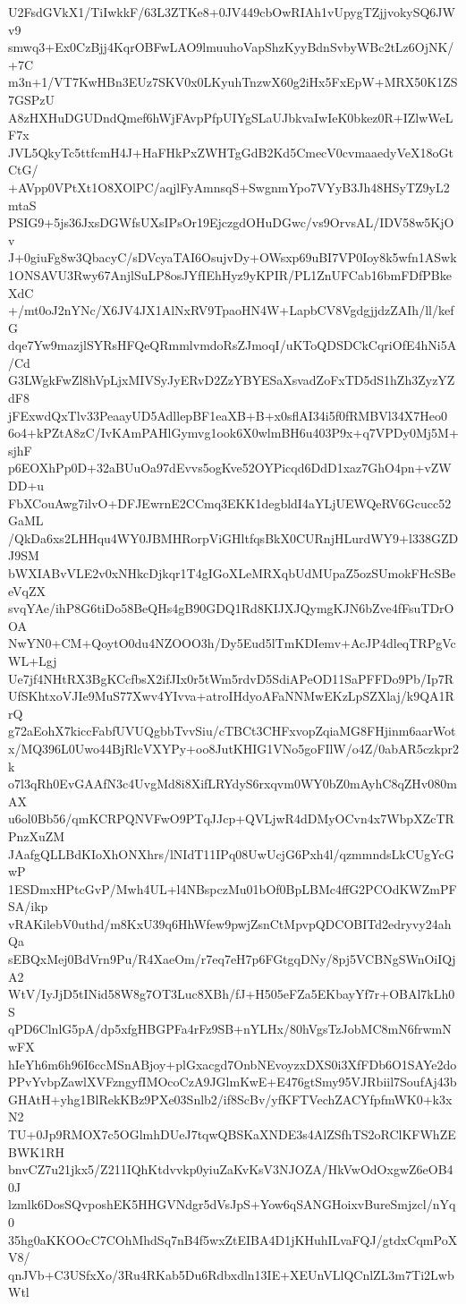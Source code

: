 U2FsdGVkX1/TiIwkkF/63L3ZTKe8+0JV449cbOwRIAh1vUpygTZjjvokySQ6JWv9
smwq3+Ex0CzBjj4KqrOBFwLAO9lmuuhoVapShzKyyBdnSvbyWBc2tLz6OjNK/+7C
m3n+1/VT7KwHBn3EUz7SKV0x0LKyuhTnzwX60g2iHx5FxEpW+MRX50K1ZS7GSPzU
A8zHXHuDGUDndQmef6hWjFAvpPfpUIYgSLaUJbkvaIwIeK0bkez0R+IZlwWeLF7x
JVL5QkyTc5ttfcmH4J+HaFHkPxZWHTgGdB2Kd5CmecV0cvmaaedyVeX18oGtCtG/
+AVpp0VPtXt1O8XOlPC/aqjlFyAmnsqS+SwgnmYpo7VYyB3Jh48HSyTZ9yL2mtaS
PSIG9+5js36JxsDGWfsUXsIPsOr19EjczgdOHuDGwc/vs9OrvsAL/IDV58w5KjOv
J+0giuFg8w3QbacyC/sDVcyaTAI6OsujvDy+OWsxp69uBI7VP0Ioy8k5wfn1ASwk
1ONSAVU3Rwy67AnjlSuLP8osJYfIEhHyz9yKPIR/PL1ZnUFCab16bmFDfPBkeXdC
+/mt0oJ2nYNc/X6JV4JX1AlNxRV9TpaoHN4W+LapbCV8VgdgjjdzZAIh/ll/kefG
dqe7Yw9mazjlSYRsHFQeQRmmlvmdoRsZJmoqI/uKToQDSDCkCqriOfE4hNi5A/Cd
G3LWgkFwZl8hVpLjxMIVSyJyERvD2ZzYBYESaXsvadZoFxTD5dS1hZh3ZyzYZdF8
jFExwdQxTlv33PeaayUD5AdllepBF1eaXB+B+x0sflAI34i5f0fRMBVl34X7Heo0
6o4+kPZtA8zC/IvKAmPAHlGymvg1ook6X0wlmBH6u403P9x+q7VPDy0Mj5M+sjhF
p6EOXhPp0D+32aBUuOa97dEvvs5ogKve52OYPicqd6DdD1xaz7GhO4pn+vZWDD+u
FbXCouAwg7ilvO+DFJEwrnE2CCmq3EKK1degbldI4aYLjUEWQeRV6Gcucc52GaML
/QkDa6xs2LHHqu4WY0JBMHRorpViGHltfqsBkX0CURnjHLurdWY9+l338GZDJ9SM
bWXIABvVLE2v0xNHkcDjkqr1T4gIGoXLeMRXqbUdMUpaZ5ozSUmokFHcSBeeVqZX
svqYAe/ihP8G6tiDo58BeQHs4gB90GDQ1Rd8KIJXJQymgKJN6bZve4fFsuTDrOOA
NwYN0+CM+QoytO0du4NZOOO3h/Dy5Eud5lTmKDIemv+AcJP4dleqTRPgVcWL+Lgj
Ue7jf4NHtRX3BgKCcfbsX2ifJIx0r5tWm5rdvD5SdiAPeOD11SaPFFDo9Pb/Ip7R
UfSKhtxoVJIe9MuS77Xwv4YIvva+atroIHdyoAFaNNMwEKzLpSZXlaj/k9QA1RrQ
g72aEohX7kiccFabfUVUQgbbTvvSiu/cTBCt3CHFxvopZqiaMG8FHjinm6aarWot
x/MQ396L0Uwo44BjRlcVXYPy+oo8JutKHIG1VNo5goFIlW/o4Z/0abAR5czkpr2k
o7l3qRh0EvGAAfN3c4UvgMd8i8XifLRYdyS6rxqvm0WY0bZ0mAyhC8qZHv080mAX
u6ol0Bb56/qmKCRPQNVFwO9PTqJJcp+QVLjwR4dDMyOCvn4x7WbpXZcTRPnzXuZM
JAafgQLLBdKIoXhONXhrs/lNIdT11IPq08UwUcjG6Pxh4l/qzmmndsLkCUgYcGwP
1ESDmxHPtcGvP/Mwh4UL+l4NBspczMu01bOf0BpLBMc4ffG2PCOdKWZmPFSA/ikp
vRAKilebV0uthd/m8KxU39q6HhWfew9pwjZsnCtMpvpQDCOBITd2edryvy24ahQa
sEBQxMej0BdVrn9Pu/R4XaeOm/r7eq7eH7p6FGtgqDNy/8pj5VCBNgSWnOiIQjA2
WtV/IyJjD5tINid58W8g7OT3Luc8XBh/fJ+H505eFZa5EKbayYf7r+OBAl7kLh0S
qPD6ClnlG5pA/dp5xfgHBGPFa4rFz9SB+nYLHx/80hVgsTzJobMC8mN6frwmNwFX
hIeYh6m6h96I6ccMSnABjoy+plGxacgd7OnbNEvoyzxDXS0i3XfFDb6O1SAYe2do
PPvYvbpZawlXVFzngyfIMOcoCzA9JGlmKwE+E476gtSmy95VJRbiil7SoufAj43b
GHAtH+yhg1BlRekKBz9PXe03Snlb2/if8ScBv/yfKFTVechZACYfpfmWK0+k3xN2
TU+0Jp9RMOX7c5OGlmhDUeJ7tqwQBSKaXNDE3s4AlZSfhTS2oRClKFWhZEBWK1RH
bnvCZ7u21jkx5/Z211IQhKtdvvkp0yiuZaKvKsV3NJOZA/HkVwOdOxgwZ6eOB40J
lzmlk6DosSQvposhEK5HHGVNdgr5dVsJpS+Yow6qSANGHoixvBureSmjzcl/nYq0
35hg0aKKOOcC7COhMhdSq7nB4f5wxZtEIBA4D1jKHuhILvaFQJ/gtdxCqmPoXV8/
qnJVb+C3USfxXo/3Ru4RKab5Du6Rdbxdln13IE+XEUnVLlQCnlZL3m7Ti2LwbWtl
